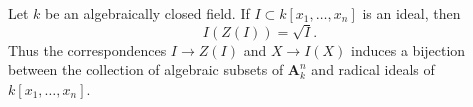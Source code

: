 \begin{thm}[Nullstellensatz]
      \label{Nullstellensatz}
      Let $k$ be an algebraically closed field. If $I\subset k[x_1,\ldots,x_n]$ is an ideal, then
      $$I(Z(I))=\sqrt{I}.$$
      Thus the correspondences $I\to Z(I)$ and $X\to I(X)$ induces a bijection between the collection of algebraic
      subsets of $\mathbf{A}^n_k$ and radical ideals of $k[x_1,\ldots,x_n]$.
\end{thm}